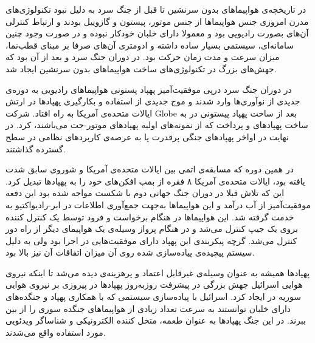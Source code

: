 
در تاریخچه‌ی هواپیماهای بدون سرنشین تا قبل از جنگ سرد به دلیل نبود تکنولوژی‌های مدرن امروزی جنس هواپیماها از جنس موتور، پیستون و گازوییل بودند و ارتباط کنترلی آن‌های بصورت رادیویی بود و معمولا دارای خلبان خودکار نبوده و در صورت وجود چنین سامانه‌ای، سیستمی بسیار ساده داشته و ادومتری آن‌های صرفا بر مبنای قطب‌نما، میزان سرعت و مدت زمان حرکت بود. در دوران جنگ سرد و بعد از آن بود که جهش‌های بزرگ در تکنولوژی‌های ساخت هواپیماهای بدون سرنشین ایجاد شد.

در دوران جنگ سرد درپی موفقیت‌آمیز پهپاد پستونی هواپیماهای رادیویی به دوره‌ی جدیدی از نوآوری‌ها وارد شدند و موج جدیدی از استفاده و بکارگیری پهپادها در ارتش ایالات متحده‌ی آمریکا به راه افتاد. شرکت Globe بعد از ساخت پهپاد پیستونی  در  به ساخت پهپادهای  و  پرداخت که از نمونه‌های اولیه پهپادهای موتور-جت می‌باشند، کرد. در نهایت در اواخر  پهپادهای جنگی پرقدرت پا به عرصه‌ی کاربردهای نظامی در سطح گسترده گذاشتند.


در همین دوره که مسابقه‌ی اتمی بین ایالات متحده‌ی آمریکا و شوروی سابق شدت یافته بود، ایالات متحده‌ی آمریکا ۸ فقره از بمب افکن‌های  خود را به پهپادها تبدیل کرد. این که تلاش قبلا در دوران جنگ جهانی دوم با شکست مواجه شده بود این دفعه موفقیت‌آمیز از آب درآمد و این هواپیماها به‌جهت جمع‌آوری اطلاعات در ابر-رادیواکتیو به خدمت گرفته شد. این هواپیماها در هنگام برخواست و فرود توسط یک کنترل کننده بروی یک جیپ کنترل می‌شد و در هنگام پرواز وسیله‌‌ی یک هواپیمای  دیگر از راه دور کنترل می‌شد. گرچه پیکربندی این پهپاد دارای موفقیت‌هایی در اجرا بود ولی به دلیل سیستم پیچیده‌ی پیاده‌سازی شده روی آن میزان اتفاقات آن نیز بالا بود.

پهپادها همیشه به عنوان وسیله‌ی غیرقابل اعتماد و پرهزینه‌ی دیده می‌شد تا اینکه نیروی هوایی اسرائیل جهش بزرگی در پیشرفت روزبه‌روز پهپاد‌ها در پیروزی بر نیروی هوایی سوریه در  ایجاد کرد. اسرائیل با پیاده‌سازی سیستمی که با همکاری پهپاد و جنگده‌های دارای خلبان توانستند به سرعت تعداد زیادی از هواپیماهای جنگده سوری را از بین ببرند. در این جنگ پهپادها به عنوان طعمه‌، متخل کننده‌ الکترونیکی و شناساگر ویدئویی مورد استفاده واقع می‌شدند.

